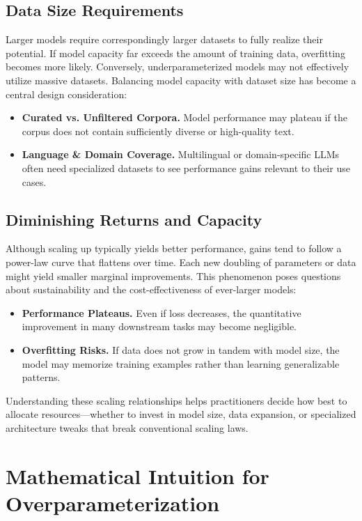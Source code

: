\subsection{Data Size Requirements}
\noindent
Larger models require correspondingly larger datasets to fully realize their potential. If model capacity far exceeds the amount of training data, overfitting becomes more likely. Conversely, underparameterized models may not effectively utilize massive datasets. Balancing model capacity with dataset size has become a central design consideration:
\begin{itemize}
    \item \textbf{Curated vs. Unfiltered Corpora.} Model performance may plateau if the corpus does not contain sufficiently diverse or high-quality text.
    \item \textbf{Language \& Domain Coverage.} Multilingual or domain-specific LLMs often need specialized datasets to see performance gains relevant to their use cases.
\end{itemize}

\subsection{Diminishing Returns and Capacity}
\noindent
Although scaling up typically yields better performance, gains tend to follow a power-law curve that flattens over time. Each new doubling of parameters or data might yield smaller marginal improvements. This phenomenon poses questions about sustainability and the cost-effectiveness of ever-larger models:
\begin{itemize}
    \item \textbf{Performance Plateaus.} Even if loss decreases, the quantitative improvement in many downstream tasks may become negligible.
    \item \textbf{Overfitting Risks.} If data does not grow in tandem with model size, the model may memorize training examples rather than learning generalizable patterns.
\end{itemize}

\noindent
Understanding these scaling relationships helps practitioners decide how best to allocate resources—whether to invest in model size, data expansion, or specialized architecture tweaks that break conventional scaling laws.

\section{Mathematical Intuition for Overparameterization}
\label{sec:overparameterization_intuition}


